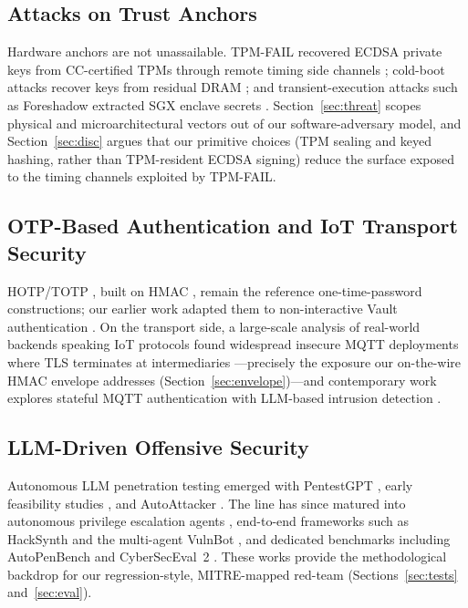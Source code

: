 \documentclass[journal]{IEEEtran}
\begin{document}
\subsection{Attacks on Trust Anchors}
Hardware anchors are not unassailable. TPM-FAIL recovered ECDSA private keys
from CC-certified TPMs through remote timing side channels
\cite{moghimi2020tpmfail}; cold-boot attacks recover keys from residual DRAM
\cite{halderman2008}; and transient-execution attacks such as Foreshadow
extracted SGX enclave secrets \cite{vanbulck2018foreshadow}.
Section~\ref{sec:threat} scopes physical and microarchitectural vectors out of
our software-adversary model, and Section~\ref{sec:disc} argues that our
primitive choices (TPM sealing and keyed hashing, rather than TPM-resident
ECDSA signing) reduce the surface exposed to the timing channels exploited by
TPM-FAIL.

\subsection{OTP-Based Authentication and IoT Transport Security}
HOTP/TOTP \cite{rfc4226,rfc6238}, built on HMAC \cite{rfc2104}, remain the
reference one-time-password constructions; our earlier work adapted them to
non-interactive Vault authentication \cite{oliveira2024}. On the transport
side, a large-scale analysis of real-world backends speaking IoT protocols
found widespread insecure MQTT deployments where TLS terminates at
intermediaries \cite{tagliaro2024backends}---precisely the exposure our
on-the-wire HMAC envelope addresses (Section~\ref{sec:envelope})---and
contemporary work explores stateful MQTT authentication with LLM-based
intrusion detection \cite{jamil2026mqtt}.

\subsection{LLM-Driven Offensive Security}
Autonomous LLM penetration testing emerged with PentestGPT \cite{pentestgpt},
early feasibility studies \cite{happe2023}, and AutoAttacker
\cite{autoattacker}. The line has since matured into autonomous privilege
escalation agents \cite{happe2025llmhackers}, end-to-end frameworks such as
HackSynth \cite{muzsai2024hacksynth} and the multi-agent VulnBot
\cite{kong2025vulnbot}, and dedicated benchmarks including AutoPenBench
\cite{gioacchini2024autopenbench} and CyberSecEval~2
\cite{bhatt2024cyberseceval2}. These works provide the methodological backdrop
for our regression-style, MITRE-mapped red-team (Sections~\ref{sec:tests}
and~\ref{sec:eval}).
\end{document}
